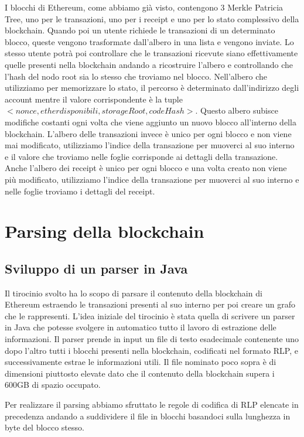 \documentclass[12pt]{report}
\begin{document}
I blocchi di Ethereum, come abbiamo già visto, contengono 3 Merkle Patricia Tree, uno per le transazioni, uno per i receipt e uno per lo stato complessivo della blockchain. Quando poi un utente richiede le transazioni di un determinato blocco, queste vengono trasformate dall'albero in una lista e vengono inviate. 
Lo stesso utente potrà poi controllare che le transazioni ricevute siano effettivamente quelle presenti nella blockchain andando a ricostruire l'albero e controllando che l'hash del nodo root sia lo stesso che troviamo nel blocco.
Nell'albero che utilizziamo per memorizzare lo stato, il percorso è determinato dall'indirizzo degli account mentre il valore corrispondente è la tuple $<nonce, ether disponibili, storageRoot, codeHash>$. Questo albero subisce modifiche costanti ogni volta che viene aggiunto un nuovo blocco all'interno della blockchain.
L'albero delle transazioni invece è unico per ogni blocco e non viene mai modificato, utilizziamo l'indice della transazione per muoverci al suo interno e il valore che troviamo nelle foglie corrisponde ai dettagli della transazione.
Anche l'albero dei receipt è unico per ogni blocco e una volta creato non viene più modificato, utilizziamo l'indice della transazione per muoverci al suo interno e nelle foglie troviamo i dettagli del receipt.

\newpage
\section{Parsing della blockchain}

\subsection {Sviluppo di un parser in Java}

Il tirocinio svolto ha lo scopo di parsare il contenuto della blockchain di Ethereum estraendo le transazioni presenti al suo interno per poi creare un grafo che le rappresenti.
L'idea iniziale del tirocinio è stata quella di scrivere un parser in Java che potesse svolgere in automatico tutto il lavoro di estrazione delle informazioni.
Il parser prende in input un file di testo esadecimale contenente uno dopo l'altro tutti i blocchi presenti nella blockchain, codificati nel formato RLP, e successivamente estrae le informazioni utili. Il file nominato poco sopra è di dimensioni piuttosto elevate dato che il contenuto della blockchain supera i 600GB di spazio occupato.

Per realizzare il parsing abbiamo sfruttato le regole di codifica di RLP elencate in precedenza andando a suddividere il file in blocchi basandoci sulla lunghezza in byte del blocco stesso.
\end{document}
